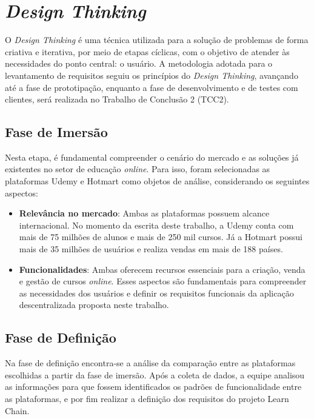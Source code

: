 \section{\textit{Design Thinking}}

O \textit{Design Thinking} é uma técnica utilizada para a solução de problemas de forma criativa e iterativa, por meio de etapas cíclicas, com o objetivo de atender às necessidades do ponto central: o usuário. A metodologia adotada para o levantamento de requisitos seguiu os princípios do \textit{Design Thinking}, avançando até a fase de prototipação, enquanto a fase de desenvolvimento e de testes com clientes, será realizada no Trabalho de Conclusão 2 (TCC2).

    \subsection{Fase de Imersão}
    Nesta etapa, é fundamental compreender o cenário do mercado e as soluções já existentes no setor de educação \textit{online}. Para isso, foram selecionadas as plataformas Udemy e Hotmart como objetos de análise, considerando os seguintes aspectos:

        \begin{itemize}
            \item \textbf{Relevância no mercado}: Ambas as plataformas possuem alcance internacional. No momento da escrita deste trabalho, a Udemy conta com mais de 75 milhões de alunos e mais de 250 mil cursos. Já a Hotmart possui mais de 35 milhões de usuários e realiza vendas em mais de 188 países.
            \item \textbf{Funcionalidades}: Ambas oferecem recursos essenciais para a criação, venda e gestão de cursos \textit{online}. Esses aspectos são fundamentais para compreender as necessidades dos usuários e definir os requisitos funcionais da aplicação descentralizada proposta neste trabalho.
        \end{itemize}

    \subsection{Fase de Definição}
        Na fase de definição encontra-se a análise da comparação entre as plataformas escolhidas a partir da fase de imersão. Após a coleta de dados, a equipe analisou as informações para que fossem identificados os padrões de funcionalidade entre as plataformas, e por fim realizar a definição dos requisitos do projeto Learn Chain.

